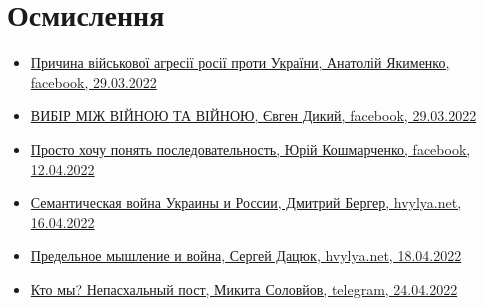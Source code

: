  
 
 
 
 
\section{Осмислення}
\label{sec:topics.vojna.osmyslenie}

\begin{itemize} %

\item \hyperlink{29_03_2022.fb.jakimenko_anatolij.1.prichina_agressii}{%
Причина військової агресії росії проти України, Анатолій Якименко, facebook, 29.03.2022%
}

\item \hyperlink{29_03_2022.fb.dykyj_evgen.1.vijna_vijna}{%
ВИБІР МІЖ ВІЙНОЮ ТА ВІЙНОЮ, Євген Дикий, facebook, 29.03.2022%
}

\item \hyperlink{12_04_2022.fb.koshmarchenko_jurij.1.posledovatelnost}{%
Просто хочу понять последовательность, Юрій Кошмарченко, facebook, 12.04.2022%
}

\item \hyperlink{16_04_2022.stz.news.ua.hvylya.1.semantic_war_ukrros}{%
Семантическая война Украины и России, Дмитрий Бергер, hvylya.net, 16.04.2022
}

\item \hyperlink{18_04_2022.stz.news.ua.hvylya.1.predelnoje_myshlenie_i_vojna}{%
Предельное мышление и война, Сергей Дацюк, hvylya.net, 18.04.2022%
}

\item \hyperlink{24_04_2022.tg.solovjov_mikita.harkov.demsokyra.1.kto_my_nepashalnyj_post}{%
Кто мы? Непасхальный пост, Микита Соловйов, telegram, 24.04.2022%
}

\end{itemize} %
